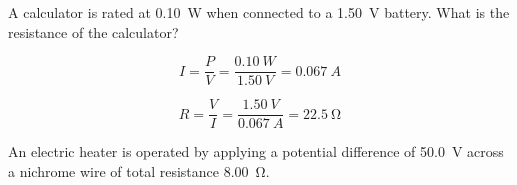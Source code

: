 \documentclass[answers]{exam}
\begin{document}
\begin{questions}
\question
A calculator is rated at \SI{0.10}{W} when connected to a \SI{1.50}{V} battery. What is the resistance of the calculator?

\begin{solution}
\begin{equation*}
    I = \frac{P}{V} = \frac{\SI{0.10}{W}}{\SI{1.50}{V}} = \SI{0.067}{A}
\end{equation*}

\begin{equation*}
    R = \frac{V}{I} = \frac{\SI{1.50}{V}}{\SI{0.067}{A}} = \boxed{\SI{22.5}{\ohm}} 
\end{equation*}
\end{solution}

\question
An electric heater is operated by applying a potential difference of \SI{50.0}{V} across a nichrome wire of total resistance \SI{8.00}{\ohm}.




\end{questions}

\clearpage
\end{document}
